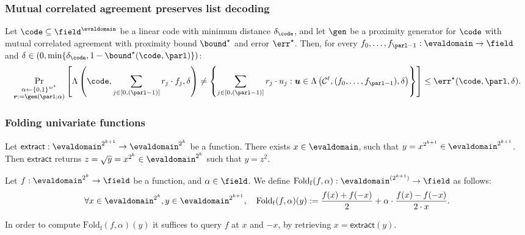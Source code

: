 \subsubsection{Mutual correlated agreement preserves list decoding}

\begin{lemma}\label{lemma: mutual_corrAgr_listdecoding}
    Let $\code \subseteq \field^{\evaldomain}$ be a linear code with minimum distance $\delta_{\code}$, and let $\gen$ be a proximity generator for $\code$ with mutual correlated agreement with proximity bound ${\bound}^\star$ and error $\err^\star$. Then, for every $f_0, \ldots, f_{\parl-1} : \evaldomain \to \field$ and $\delta \in (0, \min\{\delta_{\code}, 1 - {\bound}^\star(\code, \parl)\})$:
    \[
    \Pr_{\substack{\alpha \leftarrow \{0,1\}^{w^\star} \\ \boldsymbol{r} := \gen(\parl; \alpha)}} \left[
    \Lambda\left(\code, \sum_{j \in [0,(\parl-1)]} r_j \cdot f_j, \delta \right) \neq 
    \left\{ \sum_{j \in [0,(\parl-1)]} r_j \cdot u_j : \boldsymbol{u} \in \Lambda\left(\mathcal{C}^\ell, (f_0, \ldots, f_{\parl-1}), \delta \right) \right\}
    \right] \leq \err^\star(\code, \parl, \delta).
    \]
\end{lemma}

\subsubsection{Folding univariate functions}

\begin{definition}\label{def:extract}
    Let $\mathsf{extract}:\evaldomain^{2^{k+1}}\rightarrow \evaldomain^{2^k}$ be a function. There exists $x \in \evaldomain$, such that $y = x^{2^{k+1}}\in\evaldomain^{2^{k+1}}$. Then $\mathsf{extract}$ returns $z = \sqrt{y} = x^{2^k}\in\evaldomain^{2^k}$ such that $y = z^2$.
\end{definition}

\begin{definition}\label{def:foldf}
    Let $f : \evaldomain^{2^k} \to \field$ be a function, and $\alpha \in \field$. We define $\mathrm{Fold_f}(f, {\alpha}) : \evaldomain^{(2^{k+1})} \to \field$ as follows:
    \[
    \forall x \in \evaldomain^{2^k}, y \in \evaldomain^{2^{k+1}}, \quad \mathrm{Fold_f}(f, \alpha)(y) := \frac{f(x) + f(-x)}{2} + \alpha \cdot \frac{f(x) - f(-x)}{2 \cdot x}.
    \]

    In order to compute $\mathrm{Fold_f}(f, \alpha)(y)$ it suffices to query $f$ at $x$ and $-x$, by retrieving $x=\mathsf{extract}(y)$.
\end{definition}

